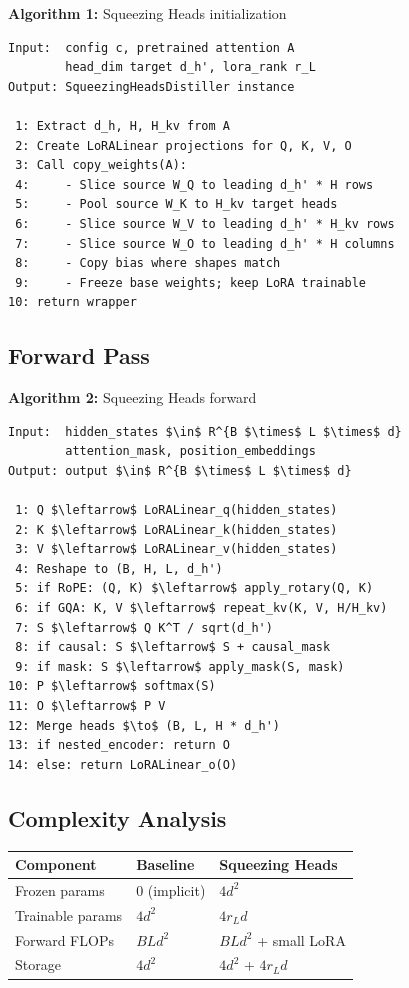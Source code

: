 \textbf{Algorithm 1:} Squeezing Heads initialization
\begin{lstlisting}
Input:  config c, pretrained attention A
        head_dim target d_h', lora_rank r_L
Output: SqueezingHeadsDistiller instance

 1: Extract d_h, H, H_kv from A
 2: Create LoRALinear projections for Q, K, V, O
 3: Call copy_weights(A):
 4:     - Slice source W_Q to leading d_h' * H rows
 5:     - Pool source W_K to H_kv target heads
 6:     - Slice source W_V to leading d_h' * H_kv rows
 7:     - Slice source W_O to leading d_h' * H columns
 8:     - Copy bias where shapes match
 9:     - Freeze base weights; keep LoRA trainable
10: return wrapper
\end{lstlisting}

\subsection{Forward Pass}

\textbf{Algorithm 2:} Squeezing Heads forward
\begin{lstlisting}
Input:  hidden_states $\in$ R^{B $\times$ L $\times$ d}
        attention_mask, position_embeddings
Output: output $\in$ R^{B $\times$ L $\times$ d}

 1: Q $\leftarrow$ LoRALinear_q(hidden_states)
 2: K $\leftarrow$ LoRALinear_k(hidden_states)
 3: V $\leftarrow$ LoRALinear_v(hidden_states)
 4: Reshape to (B, H, L, d_h')
 5: if RoPE: (Q, K) $\leftarrow$ apply_rotary(Q, K)
 6: if GQA: K, V $\leftarrow$ repeat_kv(K, V, H/H_kv)
 7: S $\leftarrow$ Q K^T / sqrt(d_h')
 8: if causal: S $\leftarrow$ S + causal_mask
 9: if mask: S $\leftarrow$ apply_mask(S, mask)
10: P $\leftarrow$ softmax(S)
11: O $\leftarrow$ P V
12: Merge heads $\to$ (B, L, H * d_h')
13: if nested_encoder: return O
14: else: return LoRALinear_o(O)
\end{lstlisting}

\subsection{Complexity Analysis}

\begin{table}[H]
\centering
\small
\begin{tabular}{lll}
\toprule
\textbf{Component} & \textbf{Baseline} & \textbf{Squeezing Heads} \\
\midrule
Frozen params & 0 (implicit) & $4 d^2$ \\
Trainable params & $4 d^2$ & $4 r_L d$ \\
Forward FLOPs & $B L d^2$ & $B L d^2$ + small LoRA \\
Storage & $4 d^2$ & $4 d^2$ + $4 r_L d$ \\
\bottomrule
\end{tabular}
\end{table}

